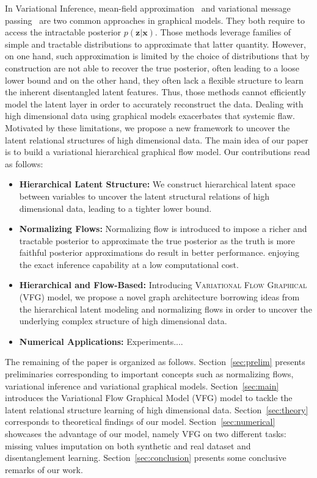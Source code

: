 \documentclass{article} %
\begin{document}
In Variational Inference, mean-field approximation~\citep{xing2012generalized} and variational message passing~\citep{winn2005variational} are two common approaches in graphical models.
They both require to access the intractable posterior $p(\mathbf{z}|\mathbf{x})$.
Those methods leverage families of simple and tractable distributions to approximate that latter quantity.
However, on one hand, such approximation is limited by the choice of distributions that by construction are not able to recover the true posterior, often leading to a loose lower bound and on the other hand, they often lack a flexible structure to learn the inherent disentangled latent features. 
Thus, those methods cannot efficiently model the latent layer in order to accurately reconstruct the data. 
Dealing with high dimensional data using graphical models exacerbates that systemic flaw.
Motivated by these limitations, we propose a new framework to uncover the latent relational structures of high dimensional data.
The main idea of our paper is to build a variational hierarchical graphical flow model. 
Our contributions read as follows:
\begin{itemize}
    \item \textbf{Hierarchical Latent Structure:} We construct hierarchical latent space between variables to uncover the latent structural relations of high dimensional data, leading to a tighter lower bound.
    \item \textbf{Normalizing Flows:} Normalizing flow is introduced to impose a richer and tractable posterior to approximate the true posterior as the truth is more faithful posterior approximations do result in better performance.  enjoying the exact inference capability at a low computational cost.
    \item \textbf{Hierarchical and Flow-Based:} Introducing \textsc{Variational Flow Graphical (VFG)} model, we propose a novel graph architecture borrowing ideas from the hierarchical latent modeling and normalizing flows in order to uncover the underlying complex structure of high dimensional data.
    \item \textbf{Numerical Applications:} Experiments....
\end{itemize}


The remaining of the paper is organized as follows.
Section~\ref{sec:prelim} presents preliminaries corresponding to important concepts such as normalizing flows, variational inference and variational graphical models.
Section~\ref{sec:main} introduces the Variational Flow Graphical Model (VFG) model to tackle the latent relational structure learning of high dimensional data.
Section~\ref{sec:theory} corresponds to theoretical findings of our model.
Section~\ref{sec:numerical} showcases the advantage of our model, namely VFG on two different tasks: missing values imputation on both synthetic and real dataset and disentanglement learning.
Section~\ref{sec:conclusion} presents some conclusive remarks of our work.
\end{document}
